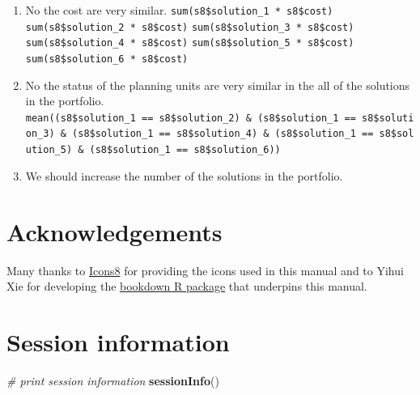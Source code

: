 \documentclass[12pt,]{book}
\newenvironment{Shaded}{\begin{snugshade}}{\end{snugshade}}
\newcommand{\KeywordTok}[1]{\textcolor[rgb]{0.13,0.29,0.53}{\textbf{#1}}}
\newcommand{\CommentTok}[1]{\textcolor[rgb]{0.56,0.35,0.01}{\textit{#1}}}
\newcommand{\NormalTok}[1]{#1}
\providecommand{\tightlist}{%
  \setlength{\itemsep}{0pt}\setlength{\parskip}{0pt}}
\let\BeginKnitrBlock\begin \let\EndKnitrBlock\end
\begin{document}
\BeginKnitrBlock{rmdanswer}
\begin{enumerate}
\def\labelenumi{\arabic{enumi}.}
\tightlist
\item
  No the cost are very similar. \newline
   \texttt{sum(s8\$solution\_1\ *\ s8\$cost)} \newline
   \texttt{sum(s8\$solution\_2\ *\ s8\$cost)} \newline
   \texttt{sum(s8\$solution\_3\ *\ s8\$cost)} \newline
   \texttt{sum(s8\$solution\_4\ *\ s8\$cost)} \newline
   \texttt{sum(s8\$solution\_5\ *\ s8\$cost)} \newline
   \texttt{sum(s8\$solution\_6\ *\ s8\$cost)}
\item
  No the status of the planning units are very similar in the all of the
  solutions in the portfolio. \newline
  \texttt{mean((s8\$solution\_1\ ==\ s8\$solution\_2)\ \&\ (s8\$solution\_1\ ==\ s8\$solution\_3)\ \&\ (s8\$solution\_1\ ==\ s8\$solution\_4)\ \&\ (s8\$solution\_1\ ==\ s8\$solution\_5)\ \&\ (s8\$solution\_1\ ==\ s8\$solution\_6))}
\item
  We should increase the number of the solutions in the portfolio.
\end{enumerate}
\EndKnitrBlock{rmdanswer}

\chapter{Acknowledgements}\label{acknowledgements}

Many thanks to \href{https://icons8.com}{Icons8} for providing the icons
used in this manual and to Yihui Xie for developing the
\href{http://bookdown.org}{bookdown R package} that underpins this
manual.

\chapter{Session information}\label{session-information}

\begin{Shaded}
\begin{Highlighting}[]
\CommentTok{# print session information}
\KeywordTok{sessionInfo}\NormalTok{()}
\end{Highlighting}
\end{Shaded}
\end{document}
